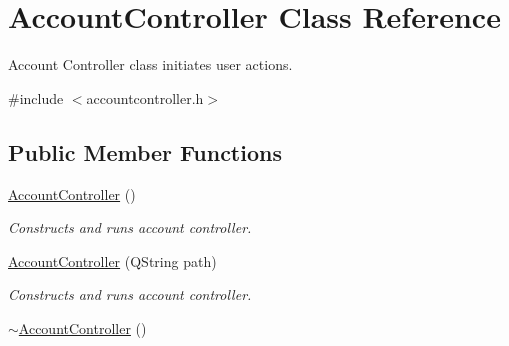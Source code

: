\hypertarget{classAccountController}{}\section{Account\+Controller Class Reference}
\label{classAccountController}


Account Controller class initiates user actions.  




{\ttfamily \#include $<$accountcontroller.\+h$>$}

\subsection*{Public Member Functions}
\begin{DoxyCompactItemize}
\item 
\hyperlink{classAccountController_a79fa83d5d57f53bba6ade1221ada3a1d}{Account\+Controller} ()\hypertarget{classAccountController_a79fa83d5d57f53bba6ade1221ada3a1d}{}\label{classAccountController_a79fa83d5d57f53bba6ade1221ada3a1d}

\begin{DoxyCompactList}\small\item\em Constructs and runs account controller. \end{DoxyCompactList}\item 
\hyperlink{classAccountController_a03a3718aa657135e8ce34d6d6f946942}{Account\+Controller} (Q\+String path)\hypertarget{classAccountController_a03a3718aa657135e8ce34d6d6f946942}{}\label{classAccountController_a03a3718aa657135e8ce34d6d6f946942}

\begin{DoxyCompactList}\small\item\em Constructs and runs account controller. \end{DoxyCompactList}\item 
\hyperlink{classAccountController_ac9951634ec2cfa0c7943f98bbab5279a}{$\sim$\+Account\+Controller} ()\hypertarget{classAccountController_ac9951634ec2cfa0c7943f98bbab5279a}{}\label{classAccountController_ac9951634ec2cfa0c7943f98bbab5279a}


\end{DoxyCompactItemize}
